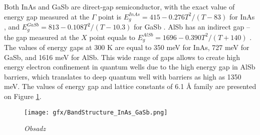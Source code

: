 \documentclass[titlepage,a4paper]{book}
\begin{document}
Both InAs and GaSb are direct-gap semiconductor, with the exact value of energy gap measured at the $\Gamma$ point is $E_g^{InAs} = 415-0.276 T^2/(T-83)$ for InAs \cite{Fang_InAs}, and $E_g^{GaSb} = 813 - 0.108 T^2/(T-10.3)$ for GaSb \cite{Wu_GaSb}. AlSb has an indirect gap – the gap measured at the $X$ point equals to $E_g^{AlSb} = 1696 - 0.390 T^2/(T+140)$ \cite{Vurgaftman_AlSb}. The values of energy gaps at 300 K are equal to 350 meV for InAs, 727 meV for GaSb, and 1616 meV for AlSb. This wide range of gaps allows to create high energy electron confinement in quantum wells due to the high energy gap in AlSb barriers, which translates to deep quantum well with barriers as high as 1350 meV. The values of energy gap and lattice constants of 6.1 Å family are presented on Figure \ref{fig:BandStructure_InAs_GaSb}.

\begin{figure}[ht]
	\centering
	\texttt{[image: gfx/BandStructure\_InAs\_GaSb.png]}
	\vspace{-10pt}
	\caption{\textit{Obsadz}}
	\label{fig:BandStructure_InAs_GaSb}
\end{figure} 
\end{document}
